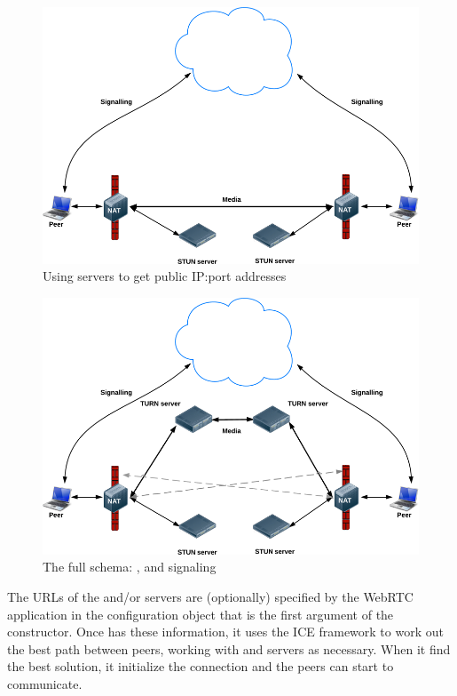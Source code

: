 \begin{figure}[ht]
  \centering
  \includegraphics[keepaspectratio=true, width=\textwidth]{images/stun}\caption{Using \STUN servers to get public IP:port addresses}
  \label{fig:stun}
\end{figure}

\begin{figure}[ht]
  \centering
  \includegraphics[keepaspectratio=true, width=\textwidth]{images/turn}\caption{The full schema: \STUN, \TURN and signaling}
  \label{fig:turn}
\end{figure}

The URLs of the \STUN and/or \TURN servers are (optionally) specified by the WebRTC application in the configuration object that is the first argument of the \RTCPeerConnection constructor. Once \RTCPeerConnection has these information, it uses the ICE framework to work out the best path between peers, working with \STUN and \TURN servers as necessary. When it find the best solution, it initialize the connection and the peers can start to communicate.

